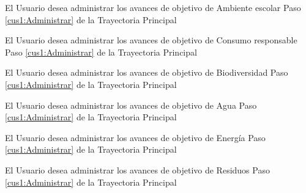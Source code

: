 \UCExtensionPoint
{El Usuario desea administrar los avances de objetivo de Ambiente escolar}
{Paso \ref{cus1:Administrar} de la Trayectoria Principal}
{}

\UCExtensionPoint
{El Usuario desea administrar los avances de objetivo de Consumo responsable}
{Paso \ref{cus1:Administrar} de la Trayectoria Principal}
{}

\UCExtensionPoint
{El Usuario desea administrar los avances de objetivo de Biodiversidad}
{Paso \ref{cus1:Administrar} de la Trayectoria Principal}
{}

\UCExtensionPoint
{El Usuario desea administrar los avances de objetivo de Agua}
{Paso \ref{cus1:Administrar} de la Trayectoria Principal}
{}

\UCExtensionPoint
{El Usuario desea administrar los avances de objetivo de Energía}
{Paso \ref{cus1:Administrar} de la Trayectoria Principal}
{}

\UCExtensionPoint
{El Usuario desea administrar los avances de objetivo de Residuos}
{Paso \ref{cus1:Administrar} de la Trayectoria Principal}
{}